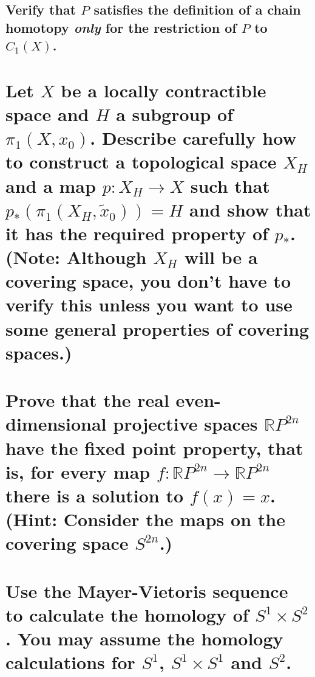 \documentclass[10pt]{article}
\newcommand{\hint}[1]{(Hint: #1)}
\newcommand{\note}[1]{(Note: #1)}
\begin{document}
\subsection{Verify that $P$ satisfies the definition of a chain homotopy \emph{only} for the
  restriction of $P$ to $C_1(X)$.}

\section{Let $X$ be a locally contractible space and $H$ a subgroup of $\pi_1(X,x_0)$. Describe
  carefully how to construct a topological space $X_H$ and a map $p:X_H \to X$ such that
  $p_*(\pi_1(X_H,\tilde{x}_0))=H$ and show that it has the required property of
  $p_*$. \note{Although $X_H$ will be a covering space, you don't have to verify this unless you
    want to use some general properties of covering spaces.}}

\section{Prove that the real even-dimensional projective spaces $\mathbb{R}P^{2n}$ have the fixed
  point property, that is, for every map $f: \mathbb{R}P^{2n} \to \mathbb{R}P^{2n}$ there is a
  solution to $f(x) =x$. \hint{Consider the maps on the covering space $S^{2n}$.}}

\section{Use the Mayer-Vietoris sequence to calculate the homology of $S^1 \times S^2$. You may
  assume the homology calculations for $S^1$, $S^1 \times S^1$ and $S^2$.}
\end{document}
